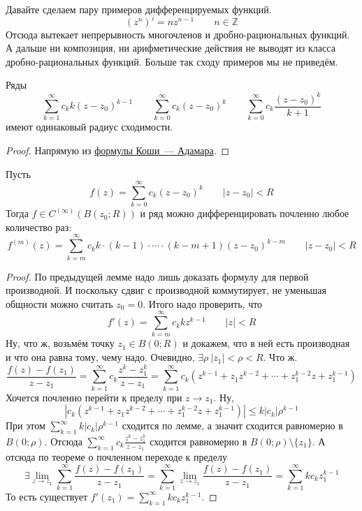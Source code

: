 \documentclass{article}
\begin{document}
    \begin{example}
        Давайте сделаем пару примеров дифференцируемых функций.
        $$
        (z^n)'=nz^{n-1}\qquad n\in\mathbb Z
        $$
        Отсюда вытекает непрерывность многочленов и дробно-рациональных функций. А дальше ни композиция, ни арифметические действия не выводят из класса дробно-рациональных функций. Больше так сходу примеров мы не приведём.
    \end{example}
    \begin{lemma}
        Ряды
        $$
        \sum\limits_{k=1}^\infty c_kk(z-z_0)^{k-1}\qquad\sum\limits_{k=0}^\infty c_k(z-z_0)^k\qquad\sum\limits_{k=0}^\infty c_k\frac{(z-z_0)^k}{k+1}
        $$
        имеют одинаковый радиус сходимости.
    \end{lemma}
    \begin{proof}
        Напрямую из \hyperref[Формула Коши-Адамара]{формулы Коши~--- Адамара}.
    \end{proof}
    \begin{theorem}
        \label{Дифференцирование степенных рядов}
        Пусть
        $$f(z)=\sum\limits_{k=0}^\infty c_k(z-z_0)^k\qquad|z-z_0|<R$$
        Тогда $f\in C^{(\infty)}(B(z_0;R))$ и ряд можно дифференцировать почленно любое количество раз:
        $$
        f^{(m)}(z)=\sum\limits_{k=m}^\infty c_kk\cdot(k-1)\cdot\cdots\cdot(k-m+1)(z-z_0)^{k-m}\qquad|z-z_0|<R
        $$
    \end{theorem}
    \begin{proof}
        По предыдущей лемме надо лишь доказать формулу для первой производной. И поскольку сдвиг с производной коммутирует, не уменьшая общности можно считать $z_0=0$. Итого надо проверить, что
        $$
        f'(z)=\sum\limits_{k=m}^\infty c_kkz^{k-1}\qquad|z|<R
        $$
        Ну, что ж, возьмём точку $z_1\in B(0;R)$ и докажем, что в ней есть производная и что она равна тому, чему надо. Очевидно, $\exists\rho~|z_1|<\rho<R$. Что ж.
        $$
        \frac{f(z)-f(z_1)}{z-z_1}=\sum\limits_{k=1}^\infty c_k\frac{z^k-z_1^k}{z-z_1}=\sum\limits_{k=1}^\infty c_k\left(z^{k-1}+z_1z^{k-2}+\cdots+z_1^{k-2}z+z_1^{k-1}\right)
        $$
        Хочется почленно перейти к пределу при $z\to z_1$. Ну,
        $$
        |c_k\left(z^{k-1}+z_1z^{k-2}+\cdots+z_1^{k-2}z+z_1^{k-1}\right)|\leqslant k|c_k|\rho^{k-1}
        $$
        При этом
        $\sum\limits_{k=1}^\infty k|c_k|\rho^{k-1}$ сходится по лемме, а значит сходится равномерно в $B(0;\rho)$. Отсюда $\sum\limits_{k=1}^\infty c_k\frac{z^k-z_1^k}{z-z_1}$ сходится равномерно в $B(0;\rho)\setminus\{z_1\}$. А отсюда по теореме о почленном переходе к пределу
        $$
        \exists\lim_{z\to z_1}\sum\limits_{k=1}^\infty\frac{f(z)-f(z_1)}{z-z_1}=\sum\limits_{k=1}^\infty\lim_{z\to z_1}\frac{f(z)-f(z_1)}{z-z_1}=\sum\limits_{k=1}^\infty kc_kz_1^{k-1}
        $$
        То есть существует $f'(z_1)=\sum\limits_{k=1}^\infty kc_kz_1^{k-1}$.
    \end{proof}
\end{document}

